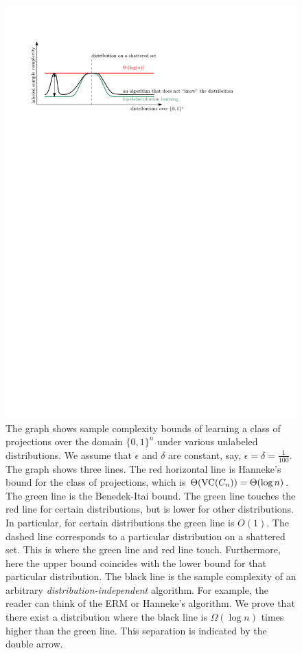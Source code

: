 \begin{figure}
\centering
\includegraphics[scale=0.55]{figure}
\caption{\small The graph shows sample complexity bounds of learning a class of
projections over the domain $\{0,1\}^n$ under various unlabeled distributions.
We assume that $\epsilon$ and $\delta$ are constant, say, $\epsilon = \delta =
\frac{1}{100}$. The graph shows three lines. The red horizontal line is
Hanneke's bound for the class of projections, which is $\Theta(\operatorname{VC}(C_n)) =
\Theta(\log n)$. The green line is the Benedek-Itai bound. The green
line touches the red line for certain distributions, but is lower for other
distributions. In particular, for certain distributions the green line is
$O(1)$. The dashed line corresponds to a particular distribution on a shattered
set. This is where the green line and red line touch. Furthermore, here the
upper bound coincides with the lower bound for that particular distribution. The
black line is the sample complexity of an arbitrary
\emph{distribution-independent} algorithm. For example, the reader can think of
the ERM or Hanneke's algorithm.
We prove that there exist a distribution where the black line is
$\Omega(\log n)$ times higher than the green line. This separation is indicated
by the double arrow.}
\label{figure:sample-complexity}
\end{figure}

